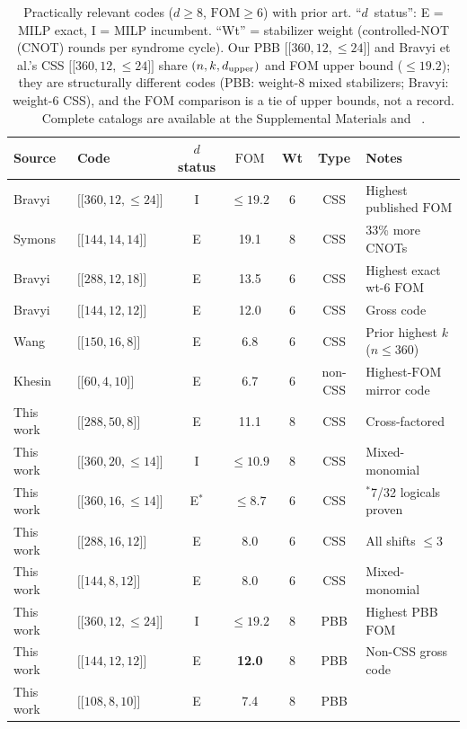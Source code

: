 \documentclass[aps,prxquantum,twocolumn,superscriptaddress,nofootinbib]{revtex4-2}
\newcommand{\dblbrk}[1]{\ensuremath{\lbrack\!\lbrack #1 \rbrack\!\rbrack}}
\newcommand{\code}[1]{\dblbrk{#1}}
\newcommand{\FOM}{\ensuremath{\mathrm{FOM}}}
\begin{document}
\begin{table}[t]
\centering
\caption{Practically relevant codes ($d \geq 8$, $\FOM \geq 6$) with prior art.
``$d$~status'': E = MILP exact, I = MILP incumbent.
``Wt'' = stabilizer weight (controlled-NOT (CNOT) rounds per syndrome cycle).
Our PBB $\code{360,12,{\leq}24}$ and Bravyi et al.'s CSS $\code{360,12,{\leq}24}$ share $(n,k,d_{\rm upper})$ and FOM upper bound (${\leq}19.2$); they are structurally different codes (PBB: weight-8 mixed stabilizers; Bravyi: weight-6 CSS), and the $\FOM$ comparison is a tie of upper bounds, not a record.
Complete catalogs are available at the Supplemental Materials and ~\protect\cite{cruzbenito2026qcode}.}
\label{tab:useful}
\small
\begin{tabular}{llccccl}
\toprule
Source & Code & $d$ status & $\FOM$ & Wt & Type & Notes \\
\midrule
Bravyi~\cite{bravyi2024high} & $\code{360,12,{\leq}24}$ & I & $\leq 19.2$ & 6 & CSS & Highest published $\FOM$ \\ 
Symons~\cite{symons2025covering} & $\code{144,14,14}$ & E & 19.1 & 8 & CSS & 33\% more CNOTs \\
Bravyi~\cite{bravyi2024high} & $\code{288,12,18}$ & E & 13.5 & 6 & CSS & Highest exact wt-6 $\FOM$ \\ 
Bravyi~\cite{bravyi2024high} & $\code{144,12,12}$ & E & 12.0 & 6 & CSS & Gross code \\
Wang~\cite{wang2024coprime} & $\code{150,16,8}$ & E & 6.8 & 6 & CSS & Prior highest $k$ ($n \leq 360$) \\ 
Khesin~\cite{khesin2026mirror} & $\code{60,4,10}$ & E & 6.7 & 6 & non-CSS & Highest-$\FOM$ mirror code \\
\midrule
This work & $\code{288,50,8}$ & E & 11.1 & 8 & CSS & Cross-factored \\
This work & $\code{360,20,{\leq}14}$ & I & $\leq 10.9$ & 8 & CSS & Mixed-monomial \\
This work & $\code{360,16,{\leq}14}$ & E$^{*}$ & ${\leq}8.7$ & 6 & CSS & $^{*}$7/32 logicals proven \\
This work & $\code{288,16,12}$ & E & 8.0 & 6 & CSS & All shifts $\leq 3$ \\
This work & $\code{144,8,12}$ & E & 8.0 & 6 & CSS & Mixed-monomial \\
\midrule
This work & $\code{360,12,{\leq}24}$ & I & $\leq 19.2$ & 8 & PBB & Highest PBB $\FOM$ \\
This work & $\code{144,12,12}$ & E & \textbf{12.0} & 8 & PBB & Non-CSS gross code \\
This work & $\code{108,8,10}$ & E & 7.4 & 8 & PBB & \\
\bottomrule
\end{tabular}
\end{table}
\end{document}
